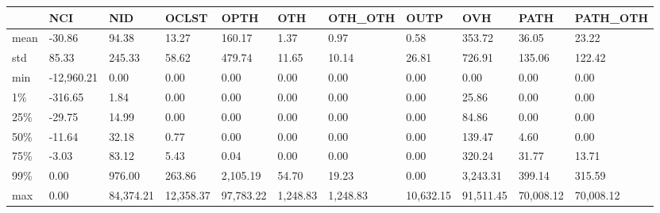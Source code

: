 \begin{tabular}{lllllllllll}
\toprule
{} &         NCI &        NID &      OCLST &       OPTH &       OTH &   OTH\_OTH &       OUTP &        OVH &       PATH &   PATH\_OTH \\
\midrule
mean &      -30.86 &      94.38 &      13.27 &     160.17 &      1.37 &      0.97 &       0.58 &     353.72 &      36.05 &      23.22 \\
std  &       85.33 &     245.33 &      58.62 &     479.74 &     11.65 &     10.14 &      26.81 &     726.91 &     135.06 &     122.42 \\
min  &  -12,960.21 &       0.00 &       0.00 &       0.00 &      0.00 &      0.00 &       0.00 &       0.00 &       0.00 &       0.00 \\
1\%   &     -316.65 &       1.84 &       0.00 &       0.00 &      0.00 &      0.00 &       0.00 &      25.86 &       0.00 &       0.00 \\
25\%  &      -29.75 &      14.99 &       0.00 &       0.00 &      0.00 &      0.00 &       0.00 &      84.86 &       0.00 &       0.00 \\
50\%  &      -11.64 &      32.18 &       0.77 &       0.00 &      0.00 &      0.00 &       0.00 &     139.47 &       4.60 &       0.00 \\
75\%  &       -3.03 &      83.12 &       5.43 &       0.04 &      0.00 &      0.00 &       0.00 &     320.24 &      31.77 &      13.71 \\
99\%  &        0.00 &     976.00 &     263.86 &   2,105.19 &     54.70 &     19.23 &       0.00 &   3,243.31 &     399.14 &     315.59 \\
max  &        0.00 &  84,374.21 &  12,358.37 &  97,783.22 &  1,248.83 &  1,248.83 &  10,632.15 &  91,511.45 &  70,008.12 &  70,008.12 \\
\bottomrule
\end{tabular}
